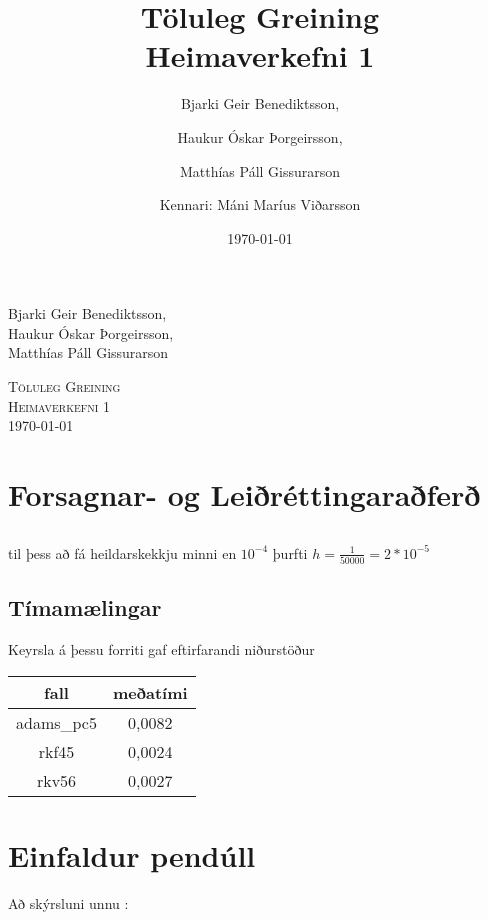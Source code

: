 \documentclass[a4]{article}
\title{Töluleg Greining\\ Heimaverkefni 1}
\date{\today{}}
\author{ 
  Bjarki Geir Benediktsson,\and
  Haukur Óskar Þorgeirsson,\and
  Matthías Páll Gissurarson \and
  Kennari: Máni Maríus Viðarsson
  }
\begin{document}
\begin{flushright}
  Bjarki Geir Benediktsson,\\
  Haukur Óskar Þorgeirsson,\\
  Matthías Páll Gissurarson\\
\end{flushright}

\begin{center}
 \textsc{ \LARGE Töluleg Greining\\
  Heimaverkefni 1\\
  \today{}
  }
  \end{center}
\vfill

\maketitle
\section{Forsagnar- og Leiðréttingaraðferð}
\subsection{}

\subsection{}
\subsection{}
til þess að fá heildarskekkju minni en $10^{-4}$ þurfti $h=\frac{1}{50000}=2*10^{-5}$

\subsection{Tímamælingar}

Keyrsla á þessu forriti gaf eftirfarandi niðurstöður\\
\begin{tabular}{|c|c|}
\hline
fall		&meðatími \\\hline
adams\_pc5	&0,0082\\\hline
rkf45		&0,0024\\\hline
rkv56		&0,0027\\\hline
\end{tabular}


\section{Einfaldur pendúll}

\vspace{20 mm}
Að skýrsluni unnu :
\hspace{0.5cm} \makebox[1.5in]{\hrulefill}
\hspace{0.5cm} \makebox[1.5in]{\hrulefill}
\hspace{0.5cm} \makebox[1.5in]{\hrulefill}
\end{document}
